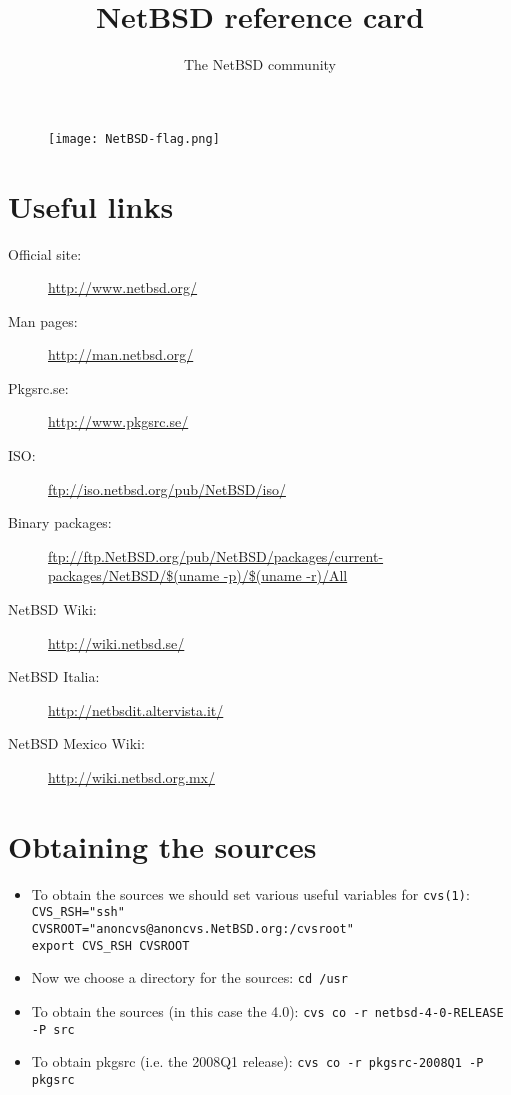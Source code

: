 \documentclass[notumble]{leaflet}
\title{NetBSD reference card}
\author{The NetBSD community}
\date{}
\newcommand{\man}[1]{\mbox{\texttt{#1}}}
\begin{document}
\begin{figure}
\centering
\texttt{[image: NetBSD-flag.png]}
\end{figure}

\maketitle
\thispagestyle{empty}

\section{Useful links}
\begin{description}
\item[Official site:] \url{http://www.netbsd.org/}
\item[Man pages:] \url{http://man.netbsd.org/}
\item[Pkgsrc.se:] \url{http://www.pkgsrc.se/}
\item[ISO:] \url{ftp://iso.netbsd.org/pub/NetBSD/iso/}
\item[Binary packages:] \url{ftp://ftp.NetBSD.org/pub/NetBSD/packages/current-packages/NetBSD/$(uname -p)/$(uname -r)/All}
\item[NetBSD Wiki:] \url{http://wiki.netbsd.se/}
\item[NetBSD Italia:] \url{http://netbsdit.altervista.it/}
\item[NetBSD Mexico Wiki:] \url{http://wiki.netbsd.org.mx/}
\end{description}


\section{Obtaining the sources}
\begin{itemize}
\item To obtain the sources we should set various useful variables for
\man{cvs(1)}:
\verb|CVS_RSH="ssh"| \\
\verb|CVSROOT="anoncvs@anoncvs.NetBSD.org:/cvsroot"| \\
\verb|export CVS_RSH CVSROOT|
\item Now we choose a directory for the sources:
\verb|cd /usr|
\item To obtain the sources (in this case the 4.0):
\verb|cvs co -r netbsd-4-0-RELEASE -P src|
\item To obtain pkgsrc (i.e. the 2008Q1 release):
\verb|cvs co -r pkgsrc-2008Q1 -P pkgsrc|
\end{itemize}
\end{document}
